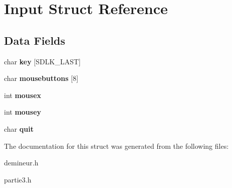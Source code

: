 \hypertarget{struct_input}{
\section{Input Struct Reference}
\label{struct_input}
}
\subsection*{Data Fields}
\begin{DoxyCompactItemize}
\item 
\hypertarget{struct_input_a169cc9b52f687d08e2529b2486507bb2}{
char {\bfseries key} \mbox{[}SDLK\_\-LAST\mbox{]}}
\label{struct_input_a169cc9b52f687d08e2529b2486507bb2}

\item 
\hypertarget{struct_input_a1684ea0a229b4105bfcbccbde948a5bc}{
char {\bfseries mousebuttons} \mbox{[}8\mbox{]}}
\label{struct_input_a1684ea0a229b4105bfcbccbde948a5bc}

\item 
\hypertarget{struct_input_aa3d2105adcc19a5aba525c805fc49ff2}{
int {\bfseries mousex}}
\label{struct_input_aa3d2105adcc19a5aba525c805fc49ff2}

\item 
\hypertarget{struct_input_a6d4a0453f23b7c4df1a7be2972529a0b}{
int {\bfseries mousey}}
\label{struct_input_a6d4a0453f23b7c4df1a7be2972529a0b}

\item 
\hypertarget{struct_input_a409d6906c2b3bc7112f51e004363ef4e}{
char {\bfseries quit}}
\label{struct_input_a409d6906c2b3bc7112f51e004363ef4e}

\end{DoxyCompactItemize}


The documentation for this struct was generated from the following files:\begin{DoxyCompactItemize}
\item 
demineur.h\item 
partie3.h\end{DoxyCompactItemize}
